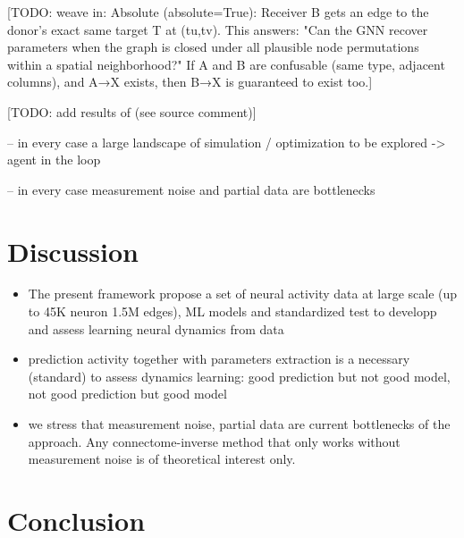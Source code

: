 \documentclass{article}
\begin{document}
[TODO: weave in: Absolute (absolute=True): Receiver B gets an edge to the donor's exact same target T at (tu,tv). This answers: "Can the GNN recover parameters when the graph is closed under all plausible node permutations within a spatial neighborhood?" If A and B are confusable (same type, adjacent columns), and A→X exists, then B→X is guaranteed to exist too.]

[TODO: add results of (see source comment)]
% 


-- in every case a large landscape of simulation / optimization to be explored -> agent in the loop

-- in every case measurement noise and partial data are bottlenecks




\section{Discussion}
\begin{itemize}
\item The present framework propose a set of neural activity data at large scale (up to 45K neuron 1.5M edges), ML models and standardized test to developp and assess learning neural dynamics from data
\item prediction activity together with parameters extraction is a necessary (standard) to assess dynamics learning: good prediction but not good model, not good prediction but good model
\item we stress that measurement noise, partial data are current bottlenecks of the approach. Any connectome-inverse method that only works without measurement noise is of theoretical interest only.
\end{itemize}



\section{Conclusion}

\begin{ack}
\end{ack}

\end{document}
